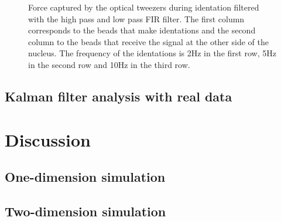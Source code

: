 \documentclass[12pt, a4paper]{article} %
\begin{document}
\begin{figure}[H]
    \centering
    
  \caption{Force captured by the optical tweezers during identation filtered with the high pass and low pass FIR filter. The first column corresponds to the beads that make identations and the second column to the beads that receive the signal at the other side of the nucleus. The frequency of the identations is 2Hz in the first row, 5Hz in the second row and 10Hz in the third row.}
  \label{fig:fourier_con_filtro_todo}
\end{figure}

\newpage
\subsection{Kalman filter analysis with real data}

\setlength{\parskip}{0mm}

\setlength{\parskip}{4mm}

\newpage


\section{Discussion}

\subsection{One-dimension simulation}

\setlength{\parskip}{0mm}

\setlength{\parskip}{4mm}


\subsection{Two-dimension simulation}
\end{document}
